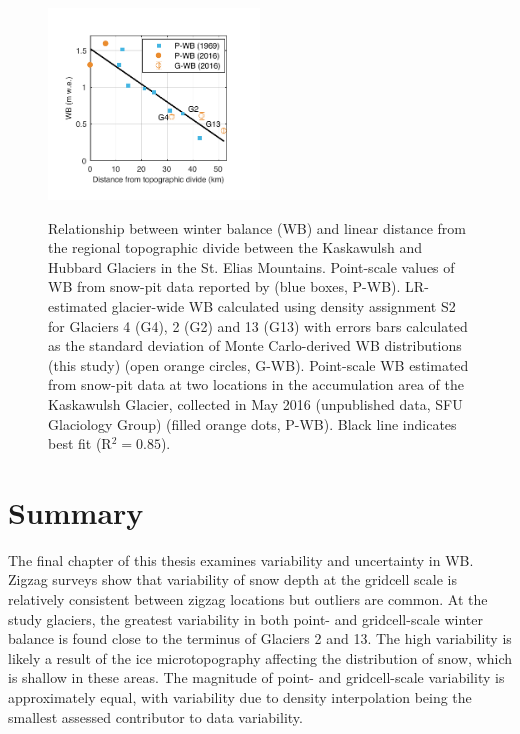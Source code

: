 \documentclass{sfuthesis}
\begin{document}
\begin{figure}[H]
	\centering
	\includegraphics[width =0.5\textwidth]{AccumGrad.pdf}\\
	\caption{Relationship between winter balance (WB) and linear distance from the regional topographic divide between the Kaskawulsh and Hubbard Glaciers in the St. Elias Mountains. Point-scale values of WB from snow-pit data reported by \cite{Taylor1969} (blue boxes, P-WB). LR-estimated glacier-wide WB calculated using density assignment S2 for Glaciers 4 (G4), 2 (G2) and 13 (G13) with errors bars calculated as the standard deviation of Monte Carlo-derived WB distributions (this study) (open orange circles, G-WB). Point-scale WB estimated from snow-pit data at two locations in the accumulation area of the Kaskawulsh Glacier, collected in May 2016 (unpublished data, SFU Glaciology Group) (filled orange dots, P-WB). Black line indicates best fit (R$^2=0.85$).}
	\label{fig:AccumGrad}
\end{figure}



 \section{Summary}
 
The final chapter of this thesis examines variability and uncertainty in WB. Zigzag surveys show that variability of snow depth at the gridcell scale is relatively consistent between zigzag locations but outliers are common. At the study glaciers, the greatest variability in both point- and gridcell-scale winter balance is found close to the terminus of Glaciers 2 and 13. The high variability is likely a result of the ice microtopography affecting the distribution of snow, which is shallow in these areas. The magnitude of point- and gridcell-scale variability is approximately equal, with variability due to density interpolation being the smallest assessed contributor to data variability. 
 
\end{document}
